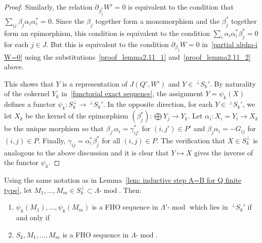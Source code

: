 \documentclass[ALCO,ThmDefs,Unicode,epreuves]{cedram}
\DeclareMathOperator{\modr}{mod}
\begin{document}
\begin{proof}
Similarly, the relation $\partial_{\beta_j^\ast}W'=0$ is equivalent to the condition that $\sum_{ij} \beta_j\alpha_i\alpha_i^\ast=0$. Since the $\beta_j$ together form a monomorphism and the $\beta_j^\ast$ together form an epimorphism, this condition is equivalent to the condition $\sum_i \alpha_i\alpha_i^\ast\beta_j^\ast=0$ for each $j\in J$. But this is equivalent to the condition $\partial_{\beta_j}W=0$ in~\eqref{partial alpha-i W=0} using the substitutions~\eqref{proof_lemma2.11_1}  and~\eqref{proof_lemma2.11_2} above.

This shows that $Y$ is a representation of $J(Q',W')$ and $Y\in \,^{\perp}S_k'$. By naturality of the cokernel $Y_k$ in~\eqref{functorial exact sequence}, the assignment $Y=\psi_k(X)$ defines a functor $\psi_k:S_k^\perp\to \,^{\perp}S_k'$. In the opposite direction, for each $Y\in\,^{\perp}S_k'$, we let $X_k$ be the kernel of the epimorphism $(\beta_j^\ast):\bigoplus Y_j\to Y_k$. Let $\alpha_i:X_i=Y_i\to X_k$ be the unique morphism so that $\beta_{j'}\alpha_i=\gamma_{ij'}^\ast$ for $(i,j')\in P'$ and $\beta_j\alpha_i=-G_{ij}$ for $(i,j)\in P$. Finally, $\gamma_{ij}=\alpha_i^\ast\beta_j^\ast$ for all $(i,j)\in P$. The verification that $X\in S_k^\perp$ is analogous to the above discussion and it is clear that $Y\mapsto X$ gives the inverse of the functor $\psi_k$.
\end{proof}



\begin{lemm}\label{lem: rotation lemma for modules}
Using the same notation as in Lemma~\ref{lem: inductive step A=B for Q finite type}, let $M_1,\ldots,M_m\in S_k^\perp\subset \Lambda\text{-}\modr $. Then: 
\begin{enumerate}
\item\label{lemma2.12_1} %
$\psi_k(M_1),\ldots,\psi_k(M_m)$ is a FHO sequence in $\Lambda'\text{-}\modr $ which lies in $\,^{\perp}S_k'$ if and only if 
\item\label{lemma2.12_2} %
$S_k,M_1,\ldots,M_m$ is a FHO sequence in $\Lambda\text{-}\modr $.
\end{enumerate}
\end{lemm}
\end{document}
